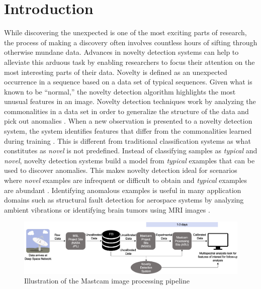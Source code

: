 \section{Introduction}
While discovering the unexpected is one of the most exciting parts of research, the process of making a discovery often involves countless hours of sifting through otherwise mundane data. 
Advances in novelty detection systems can help to alleviate this arduous task by enabling researchers to focus their attention on the most interesting parts of their data. 
Novelty is defined as an unexpected occurrence in a sequence based on a data set of typical sequences.
Given what is known to be “normal,” the novelty detection algorithm highlights the most unusual features in an image. 
Novelty detection techniques work by analyzing the commonalities in a data set in order to generalize the structure of the data and pick out anomalies \citep{japkowicz1995novelty}.
When a new observation is presented to a novelty detection system, the system identifies features that differ from the commonalities learned during training \citep{markou2003novelty}.
This is different from traditional classification systems as what constitutes as \textit{novel} is not predefined. 
Instead of classifying samples as \textit{typical} and \textit{novel}, novelty detection systems build a model from \textit{typical} examples that can be used to discover anomalies. 
This makes novelty detection ideal for scenarios where \textit{novel} examples are infrequent or difficult to obtain and \textit{typical} examples are abundant \citep{japkowicz1995novelty}.
Identifying anomalous examples is useful in many application domains such as structural fault detection for aerospace systems by analyzing ambient vibrations \citep{worden1997structural} or identifying brain tumors using MRI images \citep{wang2020brain}.
\begin{figure}
\centering
\includegraphics[width=\linewidth]{figs/msl/DSN.png}
\caption[Mastcam Image Processing Pipeline]{Illustration of the Mastcam image processing pipeline \protect\citep{kerner2020comparison}}
\label{msl/fig:timeline}
\end{figure}


